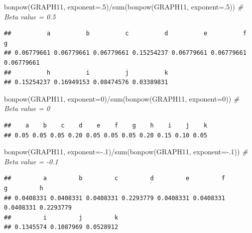 \documentclass[
  notitlepage,
  onecolumn,
  openany]{book}
\newenvironment{Shaded}{\begin{snugshade}}{\end{snugshade}}
\newcommand{\AttributeTok}[1]{\textcolor[rgb]{0.77,0.63,0.00}{#1}}
\newcommand{\CommentTok}[1]{\textcolor[rgb]{0.56,0.35,0.01}{\textit{#1}}}
\newcommand{\DecValTok}[1]{\textcolor[rgb]{0.00,0.00,0.81}{#1}}
\newcommand{\FunctionTok}[1]{\textcolor[rgb]{0.00,0.00,0.00}{#1}}
\newcommand{\NormalTok}[1]{#1}
\newcommand{\SpecialCharTok}[1]{\textcolor[rgb]{0.00,0.00,0.00}{#1}}
\begin{document}
\begin{Shaded}
\begin{Highlighting}[]
\FunctionTok{bonpow}\NormalTok{(GRAPH11, }\AttributeTok{exponent=}\NormalTok{.}\DecValTok{5}\NormalTok{)}\SpecialCharTok{/}\FunctionTok{sum}\NormalTok{(}\FunctionTok{bonpow}\NormalTok{(GRAPH11, }\AttributeTok{exponent=}\NormalTok{.}\DecValTok{5}\NormalTok{)) }\CommentTok{\# Beta value = 0.5}
\end{Highlighting}
\end{Shaded}

\begin{verbatim}
##          a          b          c          d          e          f          g 
## 0.06779661 0.06779661 0.06779661 0.15254237 0.06779661 0.06779661 0.06779661 
##          h          i          j          k 
## 0.15254237 0.16949153 0.08474576 0.03389831
\end{verbatim}

\begin{Shaded}
\begin{Highlighting}[]
\FunctionTok{bonpow}\NormalTok{(GRAPH11, }\AttributeTok{exponent=}\DecValTok{0}\NormalTok{)}\SpecialCharTok{/}\FunctionTok{sum}\NormalTok{(}\FunctionTok{bonpow}\NormalTok{(GRAPH11, }\AttributeTok{exponent=}\DecValTok{0}\NormalTok{)) }\CommentTok{\# Beta value = 0}
\end{Highlighting}
\end{Shaded}

\begin{verbatim}
##    a    b    c    d    e    f    g    h    i    j    k 
## 0.05 0.05 0.05 0.20 0.05 0.05 0.05 0.20 0.15 0.10 0.05
\end{verbatim}

\begin{Shaded}
\begin{Highlighting}[]
\FunctionTok{bonpow}\NormalTok{(GRAPH11, }\AttributeTok{exponent=}\SpecialCharTok{{-}}\NormalTok{.}\DecValTok{1}\NormalTok{)}\SpecialCharTok{/}\FunctionTok{sum}\NormalTok{(}\FunctionTok{bonpow}\NormalTok{(GRAPH11, }\AttributeTok{exponent=}\SpecialCharTok{{-}}\NormalTok{.}\DecValTok{1}\NormalTok{)) }\CommentTok{\# Beta value = {-}0.1}
\end{Highlighting}
\end{Shaded}

\begin{verbatim}
##         a         b         c         d         e         f         g         h 
## 0.0408331 0.0408331 0.0408331 0.2293779 0.0408331 0.0408331 0.0408331 0.2293779 
##         i         j         k 
## 0.1345574 0.1087969 0.0528912
\end{verbatim}
\end{document}
